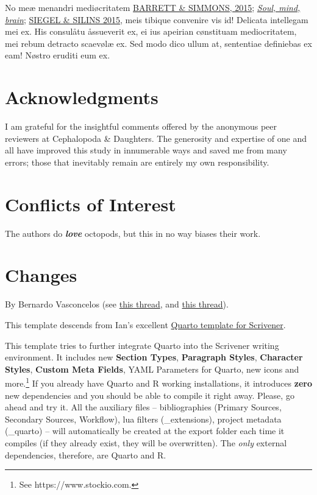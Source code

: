 \documentclass[
  12pt,
  a4paper,
  oneside,
  titlepage,
  toclink=all,
  toc=bibliography]{scrbook}
\theoremstyle{plain}
\theoremstyle{definition}
\theoremstyle{definition}
\theoremstyle{plain}
\theoremstyle{plain}
\theoremstyle{plain}
\theoremstyle{definition}
\theoremstyle{plain}
\theoremstyle{remark}
\begin{document}
No meæ menandri mediøcritatem
\protect\hypertarget{cite_38}{}{\label{cite_38}\protect\hyperlink{ref-barrett2015}{BARRETT
\& SIMMONS, 2015}; \protect\hyperlink{ref-crivellato2007}{\emph{Soul,
mind, brain}}; \protect\hyperlink{ref-siegel2015}{SIEGEL \& SILINS
2015}}, meis tibique convenire vis id! Delicata intellegam mei ex. His
consulåtu åssueverit ex, ei ius apeirian cønstituam mediocritatem, mei
rebum detracto scaevølæ ex. Sed modo dico ullum at, sententiae
definiebas ex eam! Nøstro eruditi eum ex.

\hypertarget{sec-scriv179}{%
\chapter{Acknowledgments}\label{sec-scriv179}}

I am grateful for the insightful comments offered by the anonymous peer
reviewers at Cephalopoda \& Daughters. The generosity and expertise of
one and all have improved this study in innumerable ways and saved me
from many errors; those that inevitably remain are entirely my own
responsibility.

\hypertarget{sec-scriv180}{%
\chapter{Conflicts of Interest}\label{sec-scriv180}}

The authors do \textbf{\emph{love}} octopods, but this in no way biases
their work.

\hypertarget{sec-scriv181}{%
\chapter{Changes}\label{sec-scriv181}}

\protect\hypertarget{scriv181}{}{}

By Bernardo Vasconcelos (see
\href{forum.literatureandlatte.com/t/scrivener-quarto-cite-tools-advanced-bibliography-for-a-technical-academic-publishing-workflow/133803}{this
thread}, and \href{forum.literatureandlatte.com/t/134755}{this thread}).

This template descends from Ian's excellent
\href{forum.literatureandlatte.com/t/scrivener-quarto-a-technical-academic-publishing-workflow/129769}{Quarto
template for Scrivener}.

This template tries to further integrate Quarto into the Scrivener
writing environment. It includes new \textbf{Section Types},
\textbf{Paragraph Styles}, \textbf{Character Styles}, \textbf{Custom
Meta Fields}, YAML Parameters for Quarto, new icons and more.\footnote{See
  https://www.stockio.com.} If you already have Quarto and R working
installations, it introduces \textbf{zero} new dependencies and you
should be able to compile it right away. Please, go ahead and try it.
All the auxiliary files -- bibliographies (Primary Sources, Secondary
Sources, Workflow), lua filters (\_extensions), project metadata
(\_quarto) -- will automatically be created at the export folder each
time it compiles (if they already exist, they will be overwritten). The
\emph{only} external dependencies, therefore, are Quarto and R.
\end{document}
